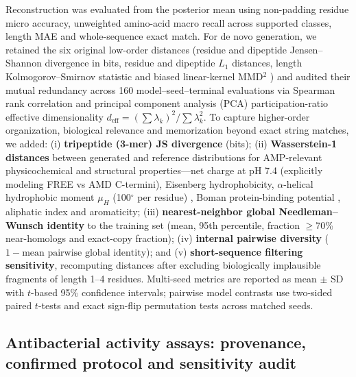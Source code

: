 \documentclass[unnumsec,webpdf,contemporary,large]{oup-authoring-template}
\newcommand{\rev}[1]{#1}
\begin{document}
Reconstruction was evaluated from the posterior mean using non-padding residue micro accuracy, unweighted amino-acid macro recall across supported classes, length MAE and whole-sequence exact match. \rev{For de novo generation, we retained the six original low-order distances (residue and dipeptide Jensen--Shannon divergence \cite{refJS} in bits, residue and dipeptide $L_1$ distances, length Kolmogorov--Smirnov statistic and biased linear-kernel MMD$^2$ \cite{refMMD}) and audited their mutual redundancy across 160 model--seed--terminal evaluations via Spearman rank correlation and principal component analysis (PCA) participation-ratio effective dimensionality $d_{\mathrm{eff}} = (\sum \lambda_k)^2 / \sum \lambda_k^2$. To capture higher-order organization, biological relevance and memorization beyond exact string matches, we added: (i) \textbf{tripeptide (3-mer) JS divergence} (bits); (ii) \textbf{Wasserstein-1 distances} between generated and reference distributions for AMP-relevant physicochemical and structural properties---net charge at pH 7.4 (explicitly modeling FREE vs AMD C-termini), Eisenberg hydrophobicity, $\alpha$-helical hydrophobic moment $\mu_H$ (100$^\circ$ per residue) \cite{refEisenberg}, Boman protein-binding potential \cite{refBoman}, aliphatic index and aromaticity; (iii) \textbf{nearest-neighbor global Needleman--Wunsch identity} to the training set (mean, 95th percentile, fraction $\geq$70\% near-homologs and exact-copy fraction); (iv) \textbf{internal pairwise diversity} ($1 - \text{mean pairwise global identity}$); and (v) \textbf{short-sequence filtering sensitivity}, recomputing distances after excluding biologically implausible fragments of length 1--4 residues. Multi-seed metrics are reported as mean $\pm$ SD with $t$-based 95\% confidence intervals; pairwise model contrasts use two-sided paired $t$-tests and exact sign-flip permutation tests across matched seeds.}

\subsection{Antibacterial activity assays: provenance, confirmed protocol and sensitivity audit}
\end{document}

